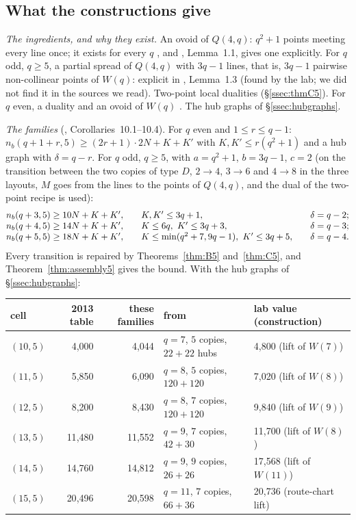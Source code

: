\documentclass[11pt]{amsart}
\theoremstyle{definition}
\theoremstyle{remark}
\begin{document}
\subsection{What the constructions give}\label{ssec:families5}
\emph{The ingredients, and why they exist.} An ovoid of $Q(4,q)$: $q^2+1$ points meeting every line once; it exists for every $q$ \cite[3.4.1]{PT}, and , Lemma~1.1, gives one explicitly. For $q$ odd, $q\ge5$, a partial spread of $Q(4,q)$ with $3q-1$ lines, that is, $3q-1$ pairwise non-collinear points of $W(q)$: explicit in , Lemma~1.3 (found by the lab; we did not find it in the sources we read). Two-point local dualities (\S\ref{ssec:thmC5}). For $q$ even, a duality and an ovoid of $W(q)$ \cite[3.2.1, 3.4.1]{PT}. The hub graphs of \S\ref{ssec:hubgraphs}.

\emph{The families} (, Corollaries~10.1--10.4). For $q$ even and $1\le r\le q-1$: $n_b(q+1+r,5)\ge(2r+1)\cdot2N+K+K'$ with $K,K'\le r(q^2+1)$ and a hub graph with $\delta=q-r$. For $q$ odd, $q\ge5$, with $a=q^2+1$, $b=3q-1$, $c=2$ (on the transition between the two copies of type $D$, $2\to4$, $3\to6$ and $4\to8$ in the three layouts, $M$ goes from the lines to the points of $Q(4,q)$, and the dual of the two-point recipe is used):
\[
\begin{array}{@{}l@{\qquad}l@{\qquad}l@{}}
n_b(q+3,5)\ge 10N+K+K', & K,K'\le 3q+1, & \delta=q-2;\\
n_b(q+4,5)\ge 14N+K+K', & K\le 6q,\ K'\le 3q+3, & \delta=q-3;\\
n_b(q+5,5)\ge 18N+K+K', & K\le\min(q^2+7,9q-1),\ K'\le 3q+5, & \delta=q-4.
\end{array}
\]
Every transition is repaired by Theorems~\ref{thm:B5} and~\ref{thm:C5}, and Theorem~\ref{thm:assembly5} gives the bound. With the hub graphs of \S\ref{ssec:hubgraphs}:

\begin{center}\small
\renewcommand{\arraystretch}{1.15}
\begin{tabular}{@{}lrrll@{}}
\toprule
cell & 2013 table & these families & from & lab value (construction)\\
\midrule
$(10,5)$ & 4{,}000 & 4{,}044 & $q=7$, $5$ copies, $22+22$ hubs & 4{,}800 (lift of $W(7)$)\\
$(11,5)$ & 5{,}850 & 6{,}090 & $q=8$, $5$ copies, $120+120$ & 7{,}020 (lift of $W(8)$)\\
$(12,5)$ & 8{,}200 & 8{,}430 & $q=8$, $7$ copies, $120+120$ & 9{,}840 (lift of $W(9)$)\\
$(13,5)$ & 11{,}480 & 11{,}552 & $q=9$, $7$ copies, $42+30$ & 11{,}700 (lift of $W(8)$)\\
$(14,5)$ & 14{,}760 & 14{,}812 & $q=9$, $9$ copies, $26+26$ & 17{,}568 (lift of $W(11)$)\\
$(15,5)$ & 20{,}496 & 20{,}598 & $q=11$, $7$ copies, $66+36$ & 20{,}736 (route-chart lift)\\
\bottomrule
\end{tabular}
\end{center}
\end{document}
